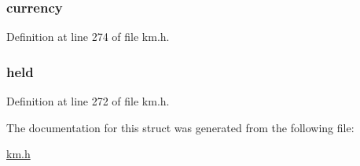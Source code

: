 \subsubsection[{\texorpdfstring{currency}{currency}}]{ currency}\hypertarget{struct_k_1_1m_wallet_a216d44ca9942257997747da567464473}{}\label{struct_k_1_1m_wallet_a216d44ca9942257997747da567464473}


Definition at line 274 of file km.\+h.

\subsubsection[{\texorpdfstring{held}{held}}]{ held}\hypertarget{struct_k_1_1m_wallet_a9b5165456071402b08d8b71ce5c2e9d0}{}\label{struct_k_1_1m_wallet_a9b5165456071402b08d8b71ce5c2e9d0}


Definition at line 272 of file km.\+h.



The documentation for this struct was generated from the following file\+:\begin{DoxyCompactItemize}
\item 
\hyperlink{km_8h}{km.\+h}\end{DoxyCompactItemize}
